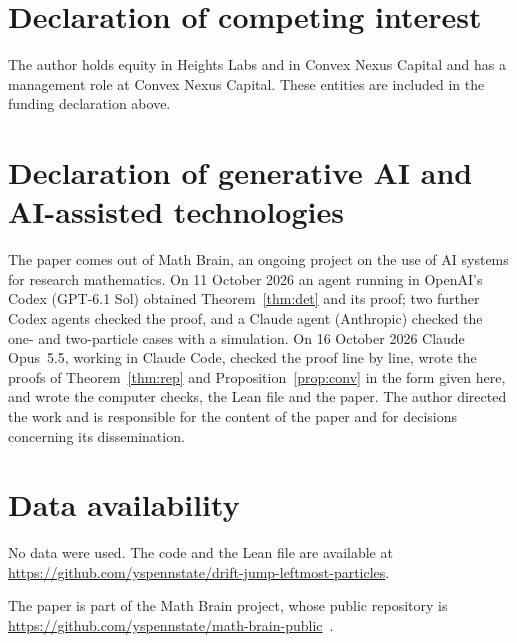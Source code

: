 \documentclass[11pt]{amsart}
\theoremstyle{remark}
\numberwithin{equation}{section}
\begin{document}
\section*{Declaration of competing interest}
The author holds equity in Heights Labs and in Convex Nexus Capital and
has a management role at Convex Nexus Capital. These entities are included
in the funding declaration above.

\section*{Declaration of generative AI and AI-assisted technologies}
The paper comes out of Math Brain, an ongoing project on the use of AI systems for research mathematics. On 11 October 2026 an agent running in OpenAI's Codex (GPT-6.1 Sol) obtained Theorem~\ref{thm:det} and its proof; two further Codex agents checked the proof, and a Claude agent (Anthropic) checked the one- and two-particle cases with a simulation. On 16 October 2026 Claude Opus~5.5, working in Claude Code, checked the proof line by line, wrote the proofs of Theorem~\ref{thm:rep} and Proposition~\ref{prop:conv} in the form given here, and wrote the computer checks, the Lean file and the paper. The author directed the work and is responsible for the content of the paper and for decisions concerning its dissemination.

\section*{Data availability}
No data were used. The code and the Lean file are available at\\ \url{https://github.com/yspennstate/drift-jump-leftmost-particles}.

The paper is part of the Math Brain project, whose public repository is \url{https://github.com/yspennstate/math-brain-public}~\cite{MathBrainRepo}.
\end{document}
